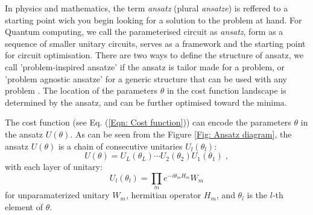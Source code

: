 In physics and mathematics, the term \emph{ansatz} (plural \emph{ansatze}) is reffered to a starting point wich you begin looking for a solution to the problem at hand.
For Quantum computing, we call the parameterised circuit as \emph{ansatz}, form as a sequence of smaller unitary circuits, serves as a framework and the starting point for circuit optimisation.
There are two ways to define the structure of ansatz, we call 'problem-inspired ansatze' if the ansatz is tailor made for a problem, or 'problem agnostic ansatze' for a generic structure that can be used with any problem \cite{cerezoCostFunctionDependent2021}.
The location of the parameters $\theta$ in the cost function landscape is determined by the ansatz, and can be further optimised toward the minima.



The cost function (see Eq. (\ref{Eqn: Cost function})) can encode the parameters $\theta$ in the ansatz $U(\theta)$.
As can be seen from the Figure \ref{Fig: Ansatz diagram}, the ansatz $U(\theta)$ is a chain of consecutive unitaries $U_l(\theta_l)$:
\begin{equation}
    U(\theta) = U_L(\theta_L) \cdots U_2(\theta_2) U_1(\theta_1)\;,
\end{equation}
with each layer of unitary:
\begin{equation}
    U_l(\theta_l) = \prod_m e^{-i\theta_m H_m} W_m
\end{equation}
for unparamaterized unitary $W_m$, hermitian operator $H_m$, and $\theta_l$ is the $l$-th element of $\theta$.